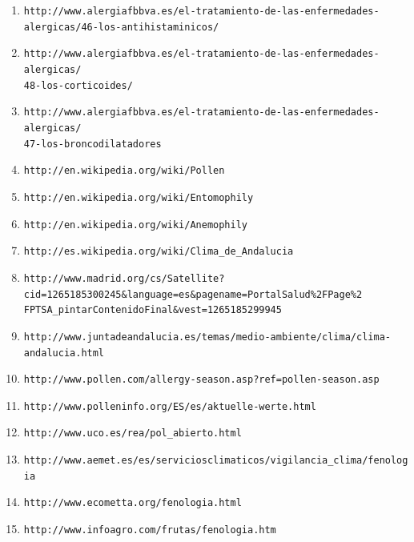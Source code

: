 \documentclass[12pt,oneside,a4paper]{article}
\numberwithin{figure}{section}
\begin{document}
\begin{enumerate}
\item \verb|http://www.alergiafbbva.es/el-tratamiento-de-las-enfermedades-|
\\ \verb|alergicas/46-los-antihistaminicos/|

\item \verb|http://www.alergiafbbva.es/el-tratamiento-de-las-enfermedades-alergicas/|
\\ \verb|48-los-corticoides/|

\item \verb|http://www.alergiafbbva.es/el-tratamiento-de-las-enfermedades-alergicas/|
\\ \verb|47-los-broncodilatadores|

\item \verb|http://en.wikipedia.org/wiki/Pollen|

\item \verb|http://en.wikipedia.org/wiki/Entomophily|

\item \verb|http://en.wikipedia.org/wiki/Anemophily|

\item \verb|http://es.wikipedia.org/wiki/Clima_de_Andalucia|

\item \verb|http://www.madrid.org/cs/Satellite?cid=1265185300245&language=es&pagename=PortalSalud%2FPage%2|
\\ \verb|FPTSA_pintarContenidoFinal&vest=1265185299945|

\item \verb|http://www.juntadeandalucia.es/temas/medio-ambiente/clima/clima-andalucia.html|
\label{ref:junta_andalucia}

\item \verb|http://www.pollen.com/allergy-season.asp?ref=pollen-season.asp|

\item \verb|http://www.polleninfo.org/ES/es/aktuelle-werte.html|

\item \verb|http://www.uco.es/rea/pol_abierto.html|

\item \verb|http://www.aemet.es/es/serviciosclimaticos/vigilancia_clima/fenologia|

\item \verb|http://www.ecometta.org/fenologia.html|

\item \verb|http://www.infoagro.com/frutas/fenologia.htm|


\end{enumerate}
\end{document}
